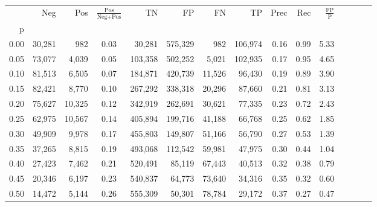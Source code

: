 \begin{tabular}{rrrcrrrrrrrrrrr}
\toprule
{} &     Neg &     Pos & $\frac{\text{Pos}}{\text{Neg}+\text{Pos}}$ &       TN &       FP &       FN &       TP &  Prec &   Rec & $\frac{\text{FP}}{\text{P}}$ \\
p    &         &         &                                            &          &          &          &          &       &       &                              \\
\midrule
0.00 &  30,281 &     982 &                                       0.03 &   30,281 &  575,329 &      982 &  106,974 &  0.16 &  0.99 &                         5.33 \\
0.05 &  73,077 &   4,039 &                                       0.05 &  103,358 &  502,252 &    5,021 &  102,935 &  0.17 &  0.95 &                         4.65 \\
0.10 &  81,513 &   6,505 &                                       0.07 &  184,871 &  420,739 &   11,526 &   96,430 &  0.19 &  0.89 &                         3.90 \\
0.15 &  82,421 &   8,770 &                                       0.10 &  267,292 &  338,318 &   20,296 &   87,660 &  0.21 &  0.81 &                         3.13 \\
0.20 &  75,627 &  10,325 &                                       0.12 &  342,919 &  262,691 &   30,621 &   77,335 &  0.23 &  0.72 &                         2.43 \\
0.25 &  62,975 &  10,567 &                                       0.14 &  405,894 &  199,716 &   41,188 &   66,768 &  0.25 &  0.62 &                         1.85 \\
0.30 &  49,909 &   9,978 &                                       0.17 &  455,803 &  149,807 &   51,166 &   56,790 &  0.27 &  0.53 &                         1.39 \\
0.35 &  37,265 &   8,815 &                                       0.19 &  493,068 &  112,542 &   59,981 &   47,975 &  0.30 &  0.44 &                         1.04 \\
0.40 &  27,423 &   7,462 &                                       0.21 &  520,491 &   85,119 &   67,443 &   40,513 &  0.32 &  0.38 &                         0.79 \\
0.45 &  20,346 &   6,197 &                                       0.23 &  540,837 &   64,773 &   73,640 &   34,316 &  0.35 &  0.32 &                         0.60 \\
0.50 &  14,472 &   5,144 &                                       0.26 &  555,309 &   50,301 &   78,784 &   29,172 &  0.37 &  0.27 &                         0.47 \\

\end{tabular}
